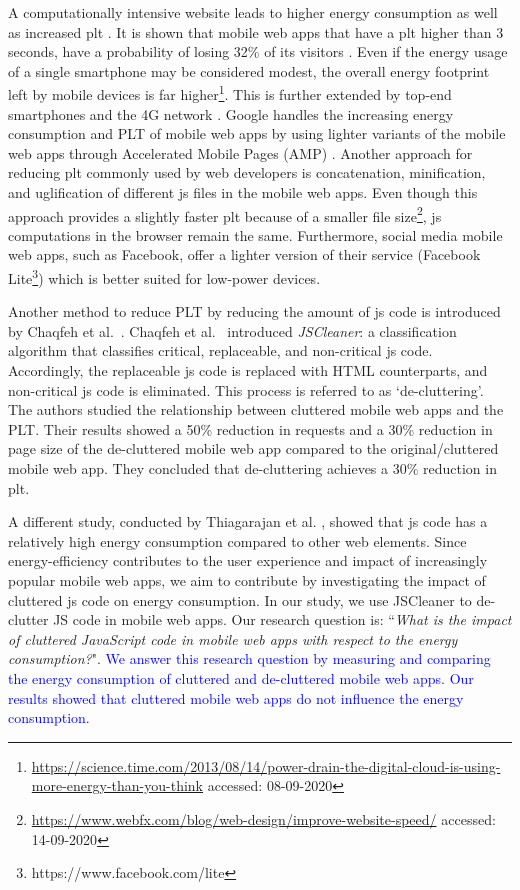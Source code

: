 A computationally intensive website leads to higher energy consumption \cite{mayo2003energy} as well as increased \acrfull{plt} \cite{chaqfeh2020jscleaner}. It is shown that mobile web apps that have a \acrshort{plt} higher than 3 seconds, have a probability of losing 32\% of its visitors \cite{googlemobbench}. Even if the energy usage of a single smartphone may be considered modest, the overall energy footprint left by mobile devices is far higher\textcolor{blue}{\footnote{\url{https://science.time.com/2013/08/14/power-drain-the-digital-cloud-is-using-more-energy-than-you-think} accessed: 08-09-2020}}. This is further extended by top-end smartphones and the 4G network \cite{chen2014demystifying}. Google handles the increasing energy consumption and PLT of mobile web apps by using lighter variants of the mobile web apps through Accelerated Mobile Pages (AMP) \cite{googleamp}. Another approach for reducing \acrshort{plt} commonly used by web developers is concatenation, minification, and uglification of different \acrshort{js} files in the mobile web apps. Even though this approach provides a slightly faster \acrshort{plt} because of a smaller file size\textcolor{blue}{\footnote{\url{https://www.webfx.com/blog/web-design/improve-website-speed/} accessed: 14-09-2020}}, \acrshort{js} computations in the browser remain the same. Furthermore, social media mobile web apps, such as Facebook, offer a lighter version of their service (Facebook Lite\footnote{https://www.facebook.com/lite}) which is better suited for low-power devices.

Another method to reduce PLT by reducing the amount of \acrshort{js} code is introduced by Chaqfeh et al.~\cite{chaqfeh2020jscleaner}. Chaqfeh et al.~\cite{chaqfeh2020jscleaner} introduced \textit{JSCleaner}: a classification algorithm that classifies critical, replaceable, and non-critical \acrshort{js} code. Accordingly, the replaceable \acrshort{js} code is replaced with HTML counterparts, and non-critical \acrshort{js} code is eliminated. This process is referred to as `de-cluttering'. The authors studied the relationship between cluttered mobile web apps and the PLT. Their results showed a 50\% reduction in requests and a 30\% reduction in page size of the de-cluttered mobile web app compared to the original/cluttered mobile web app. They concluded that de-cluttering achieves a 30\% reduction in \acrshort{plt}. 

A different study, conducted by Thiagarajan et al. \cite{thiagarajan2012battery}, showed that \acrshort{js} code has a relatively high energy consumption compared to other web elements. Since energy-efficiency contributes to the user experience and impact of increasingly popular mobile web apps, we aim to contribute by investigating the impact of cluttered \acrshort{js} code on energy consumption. In our study, we use JSCleaner to de-clutter JS code in mobile web apps. Our research question is: ``\textit{What is the impact of cluttered JavaScript code in mobile web apps with respect to the energy consumption?}". \textcolor{blue}{We answer this research question by measuring and comparing the energy consumption of cluttered and de-cluttered mobile web apps. Our results showed that cluttered mobile web apps do not influence the energy consumption.}

